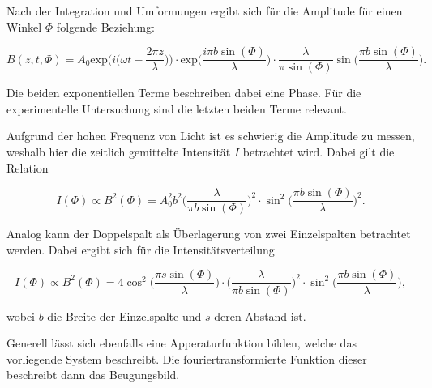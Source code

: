 Nach der Integration und Umformungen ergibt sich für die Amplitude für einen Winkel $\Phi$ folgende Beziehung:

\begin{equation}
    \label{eqn:amp-integration}
    B(z, t, \Phi) = A_0 \text{exp} \bigg( i \bigg( \omega t - \frac{2 \pi z}{\lambda} \bigg) \bigg) \cdot \text{exp} \bigg( \frac{i \pi b \sin (\Phi)}{\lambda} \bigg) \cdot \frac{\lambda}{\pi \sin( \Phi )} \sin \bigg( \frac{\pi b \sin(\Phi )}{\lambda} \bigg).
\end{equation}

Die beiden exponentiellen Terme beschreiben dabei eine Phase. Für die experimentelle Untersuchung sind die letzten beiden Terme relevant.

Aufgrund der hohen Frequenz von Licht ist es schwierig die Amplitude zu messen, weshalb hier die zeitlich gemittelte Intensität $I$ betrachtet wird. Dabei gilt die Relation

\begin{equation}
    \label{eqn:intensitaet-einzel}
    I ( \Phi ) \propto B^2 ( \Phi ) = A_0^2 b^2 \bigg( \frac{\lambda}{\pi b \sin ( \Phi )} \bigg)^2 \cdot \sin^2 \bigg( \frac{\pi b \sin(\Phi)}{\lambda} \bigg)^2.
\end{equation}

Analog kann der Doppelspalt als Überlagerung von zwei Einzelspalten betrachtet werden.
Dabei ergibt sich für die Intensitätsverteilung

\begin{equation}
    \label{eqn:intensitaet-doppel}
    I ( \Phi ) \propto B^2 (\Phi ) = 4 \cos^2 \bigg ( \frac{\pi s \sin( \Phi )}{\lambda} \bigg) \cdot \bigg( \frac{\lambda}{\pi b \sin( \Phi )} \bigg)^2 \cdot \sin^2 \bigg( \frac{\pi b \sin ( \Phi )}{\lambda} \bigg),
\end{equation}

wobei $b$ die Breite der Einzelspalte und $s$ deren Abstand ist.

Generell lässt sich ebenfalls eine Apperaturfunktion bilden, welche das vorliegende System beschreibt.
Die fouriertransformierte Funktion dieser beschreibt dann das Beugungsbild.